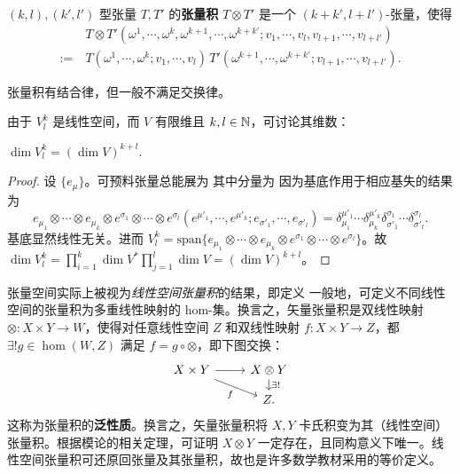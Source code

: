 \begin{definition}
    $(k,l),(k',l')$ 型张量 $T,T'$ 的\textbf{张量积} $T\otimes T'$ 是一个 $(k+k',l+l')$-张量，使得
\begin{align}
    &T\otimes T'(\omega^1,\cdots,\omega^k,\omega^{k+1},\cdots,\omega^{k+k'};v_1,\cdots,v_l,v_{l+1},\cdots,v_{l+l'})\nonumber\\
    :=\ &T(\omega^1,\cdots,\omega^k;v_1,\cdots,v_l)\,T'(\omega^{k+1},\cdots,\omega^{k+k'};v_{l+1},\cdots,v_{l+l'}).
\end{align}
\end{definition}
\begin{remark}
    张量积有结合律，但一般不满足交换律。
\end{remark}
由于 $V^k_l$ 是线性空间，而 $V$ 有限维且 $k,l\in\mathbb{N}$，可讨论其维数：
\begin{theorem}
    $\dim V^k_l=(\dim V)^{k+l}.$
\end{theorem}
\begin{proof}
    设 $\{e_\mu\}$。可预料张量总能展为
其中分量为
因为基底作用于相应基失的结果为
    \[e_{\mu_1}\otimes\cdots\otimes e_{\mu_k}\otimes e^{\sigma_1}\otimes\cdots\otimes e^{\sigma_l}(e^{\mu'_1},\cdots,e^{\mu'_k};e_{\sigma'_1},\cdots,e_{\sigma'_l})=\delta^{\mu'_1}_{\mu_1}\cdots\delta^{\mu'_k}_{\mu_k}\delta^{\sigma_1}_{\sigma'_1}\cdots\delta^{\sigma_l}_{\sigma'_l}.\]
基底显然线性无关。进而 $V_l^k=\mathrm{span}\{e_{\mu_1}\otimes\cdots\otimes e_{\mu_k}\otimes e^{\sigma_1}\otimes\cdots\otimes e^{\sigma_l}\}$。故 $\dim V_l^k=\prod_{i=1}^k\dim V^*\prod_{j=1}^l\dim V=(\dim V)^{k+l}$。
\end{proof}

张量空间实际上被视为\textit{线性空间张量积}的结果，即定义
一般地，可定义不同线性空间的张量积为多重线性映射的 hom-集。换言之，矢量张量积是双线性映射 $\otimes:X\times Y\to W$，使得对任意线性空间 $Z$ 和双线性映射 $f: X\times Y\to Z$，都 $\exists!g\in\hom(W,Z)$ 满足 $f=g\circ\otimes$，即下图交换：
    \[ \begin{tikzcd}[row sep=small]
        X \times Y \arrow[rd, "f"'] \arrow[r] & X\otimes Y \arrow[d, "\exists!"] \\
        & Z.
    \end{tikzcd} \]
这称为张量积的\textbf{泛性质}。换言之，矢量张量积将 $X,Y$ 卡氏积变为其（线性空间）张量积。根据模论的相关定理，可证明 $X\otimes Y$ 一定存在，且同构意义下唯一。线性空间张量积可还原回张量及其张量积，故也是许多数学教材采用的等价定义。

